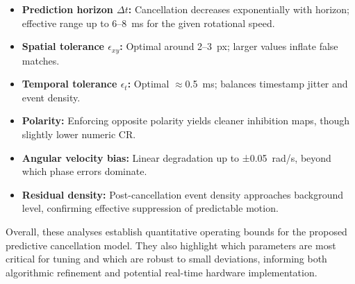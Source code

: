 \begin{itemize}
    \item \textbf{Prediction horizon \(\Delta t\):} Cancellation decreases exponentially with horizon; effective range up to 6–8~ms for the given rotational speed.
    \item \textbf{Spatial tolerance \(\epsilon_{xy}\):} Optimal around 2–3~px; larger values inflate false matches.
    \item \textbf{Temporal tolerance \(\epsilon_t\):} Optimal \(\approx\)0.5~ms; balances timestamp jitter and event density.
    \item \textbf{Polarity:} Enforcing opposite polarity yields cleaner inhibition maps, though slightly lower numeric CR.
    \item \textbf{Angular velocity bias:} Linear degradation up to ±0.05~rad/s, beyond which phase errors dominate.
    \item \textbf{Residual density:} Post-cancellation event density approaches background level, confirming effective suppression of predictable motion.
\end{itemize}

Overall, these analyses establish quantitative operating bounds for the proposed predictive cancellation model. 
They also highlight which parameters are most critical for tuning and which are robust to small deviations, informing both algorithmic refinement and potential real-time hardware implementation.

